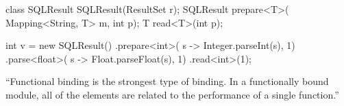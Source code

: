 \documentclass{article}
\begin{document}
\begin{multicols}{2}
{\scriptsize\begin{ffcode}
class SQLResult {
  SQLResult(ResultSet r);
  SQLResult prepare<T>(
    Mapping<String, T> m, int p);
  T read<T>(int p);
}

int v = new SQLResult()
  .prepare<int>(
    s -> Integer.parseInt(s), 1)
  .parse<float>(
    s -> Float.parseFloat(s), 1)
  .read<int>(1);
\end{ffcode}
}
\par\columnbreak\par
``Functional binding is the strongest type of binding. In a functionally bound module, all of the elements are related to the performance of a single function.''
\end{multicols}
\plush{}

\end{document}
